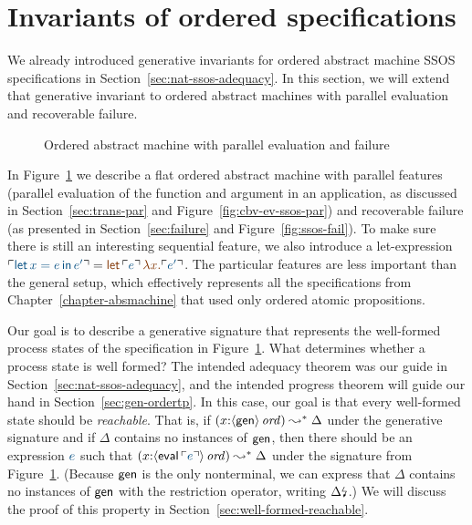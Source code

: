 \section{Invariants of ordered specifications}
\label{sec:gen-order}

We already introduced generative invariants for ordered
abstract machine SSOS specifications in
Section~\ref{sec:nat-ssos-adequacy}. In this section, we will extend 
that generative invariant to ordered abstract machines
with parallel evaluation and recoverable failure.


\begin{figure}[t]
\caption{Ordered abstract machine with parallel evaluation and failure}
\label{fig:gen-order-prog}
\end{figure}

In Figure~\ref{fig:gen-order-prog} we describe a flat ordered abstract
machine with parallel features (parallel evaluation of the function
and argument in an application, as discussed in
Section~\ref{sec:trans-par} and Figure~\ref{fig:cbv-ev-ssos-par}) and
recoverable failure (as presented in Section~\ref{sec:failure} and
Figure~\ref{fig:ssos-fail}). To make sure there is still an
interesting sequential feature, we also introduce a let-expression
$\interp{{\sf let}\,x = e\,{\sf in}\,e'} = \lf{{\sf
    let}\,\interp{e}\,\lambda x.\interp{e'}}$. The particular features
are less important than the general setup, which effectively
represents all the specifications from
Chapter~\ref{chapter-absmachine} that used only ordered atomic
propositions.


Our goal is to describe a generative signature that represents the
well-formed process states of the specification in
Figure~\ref{fig:gen-order-prog}. What determines whether a process
state is well formed? The intended adequacy theorem was our guide in
Section~\ref{sec:nat-ssos-adequacy}, and the intended progress theorem
will guide our hand in Section~\ref{sec:gen-ordertp}. In this case,
our goal is that every well-formed state should be {\it
  reachable}. That is, if $(x{:}{\langle {\sf gen} \rangle}\,{{\it ord}})
\leadsto^* \Delta$ under the generative signature and if $\Delta$ contains no
instances of ${\sf gen}$, then there should be an expression $\obj{e}$
such that $(x{:}\istrue{\susp{{\sf eval}\,\interp{e}}}) \leadsto^*
\Delta$ under the signature from
Figure~\ref{fig:gen-order-prog}. (Because ${\sf gen}$ is the only
nonterminal, we can express that $\Delta$ contains no instances of
${\sf gen}$ with the restriction operator, writing
${\Delta}{\mbox{\lightning}}_{}$.) We will discuss the proof of this property
in Section~\ref{sec:well-formed-reachable}.

